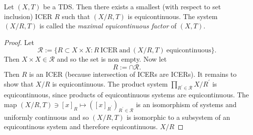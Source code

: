 \begin{theorem}
  Let $(X,T)$ be a TDS.
  Then there exists a smallest (with respect to set inclusion) ICER $R$ such that $(X/R, T)$ is equicontinuous.
    The system $(X/R,T)$ is called the \emph{maximal equicontinuous factor} of $(X,T)$.
\end{theorem}
\begin{proof}
  Let
  \begin{equation*}
    \mathcal{R} := \{ R \subset X \times X : R \ \text{ICER} \ \text{and} \ (X/R,T) \ \text{equicontinuous}\}.
  \end{equation*}
  Then $ X \times X \in \mathcal{R}$ and so the set is non empty.
  Now let 
  \begin{equation*}
    R:= \cap \mathcal{R}.
  \end{equation*}
  Then $R$ is an ICER (because intersection of ICERs are ICERs).
  It remains to show that $X/R$ is equicontinuous.
  The product system $\prod_{R^\prime \in \mathcal{R}} X/R^\prime$ is equicontinuous, since products of equicontinuous systems are equicontinuous.
  The map $(X/R, T) \ni  [x]_R  \mapsto ([x]_{R^\prime})_{R^\prime \in \mathcal{R}}$ is an isomorphism of systems and uniformly continuous and so $(X/R,T)$ is isomorphic to a subsystem of an equicontinous system and therefore equicontinuous.
  $X/R$
\end{proof}
